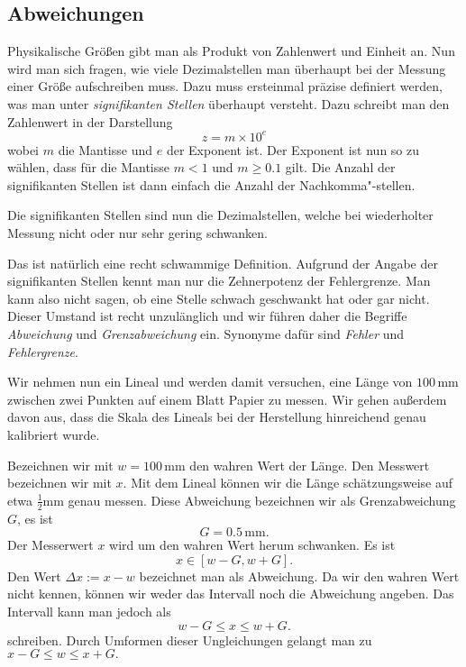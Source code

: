 \documentclass[a4paper,10pt,fleqn,twocolumn,twoside,dvipdfmx]{scrartcl}
\numberwithin{equation}{section}
\begin{document}
\subsection{Abweichungen}

Physikalische Größen gibt man als Produkt von Zahlenwert und Einheit
an. Nun wird man sich fragen, wie viele Dezimalstellen man überhaupt
bei der Messung einer Größe aufschreiben muss. Dazu muss ersteinmal
präzise definiert werden, was man unter
\textit{signifikanten Stellen} überhaupt versteht. Dazu schreibt man
den Zahlenwert in der Darstellung%
\begin{equation}
z = m\times 10^{e}
\end{equation}
wobei $m$ die Mantisse und $e$ der Exponent ist. Der Exponent
ist nun so zu wählen, dass für die Mantisse $m<1$ und $m\ge 0.1$
gilt. Die Anzahl der signifikanten Stellen ist dann einfach die
Anzahl der Nachkomma"-stellen.

Die signifikanten Stellen sind nun die Dezimalstellen, welche bei
wiederholter Messung nicht oder nur sehr gering schwanken.

Das ist natürlich eine recht schwammige Definition. Aufgrund der
Angabe der signifikanten Stellen kennt man nur die Zehnerpotenz
der Fehlergrenze. Man kann also nicht sagen, ob eine Stelle schwach
geschwankt hat oder gar nicht. Dieser Umstand ist recht unzulänglich
und wir führen daher die Begriffe \emph{Abweichung} und
\emph{Grenzabweichung} ein. Synonyme dafür sind \emph{Fehler} und
\emph{Fehlergrenze}.

Wir nehmen nun ein Lineal und werden damit versuchen, eine Länge
von $100\,\mathrm{mm}$
zwischen zwei Punkten auf einem Blatt Papier zu messen. Wir gehen
außerdem davon aus, dass die Skala des Lineals bei der Herstellung
hinreichend genau kalibriert wurde.

Bezeichnen wir mit $w=100\,\mathrm{mm}$ den wahren Wert der Länge.
Den Messwert bezeichnen wir mit $x$. Mit dem Lineal können wir
die Länge schätzungsweise auf etwa $\frac{1}{2}\mathrm{mm}$ genau
messen. Diese Abweichung bezeichnen wir als Grenzabweichung $G$,
es ist%
\begin{equation}
G = 0.5\,\mathrm{mm}.
\end{equation}
Der Messerwert $x$ wird um den wahren Wert herum schwanken. Es ist%
\begin{equation}
x\in [w-G,w+G].
\end{equation}
Den Wert $\Delta x := x-w$ bezeichnet man als Abweichung. Da wir
den wahren Wert nicht kennen, können wir weder das Intervall noch
die Abweichung angeben. Das Intervall kann man jedoch als%
\begin{equation}
w-G\le x\le w+G.
\end{equation}
schreiben. Durch Umformen dieser Ungleichungen gelangt man zu
$x-G\le w\le x+G.$
\end{document}
